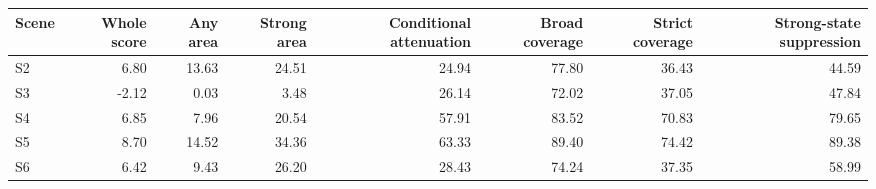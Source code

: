 \begin{tabular}{lrrrrrrr}
\toprule
Scene & Whole score & Any area & Strong area & Conditional attenuation & Broad coverage & Strict coverage & Strong-state suppression \\
\midrule
S2 & 6.80 & 13.63 & 24.51 & 24.94 & 77.80 & 36.43 & 44.59 \\
S3 & -2.12 & 0.03 & 3.48 & 26.14 & 72.02 & 37.05 & 47.84 \\
S4 & 6.85 & 7.96 & 20.54 & 57.91 & 83.52 & 70.83 & 79.65 \\
S5 & 8.70 & 14.52 & 34.36 & 63.33 & 89.40 & 74.42 & 89.38 \\
S6 & 6.42 & 9.43 & 26.20 & 28.43 & 74.24 & 37.35 & 58.99 \\
\bottomrule
\end{tabular}
